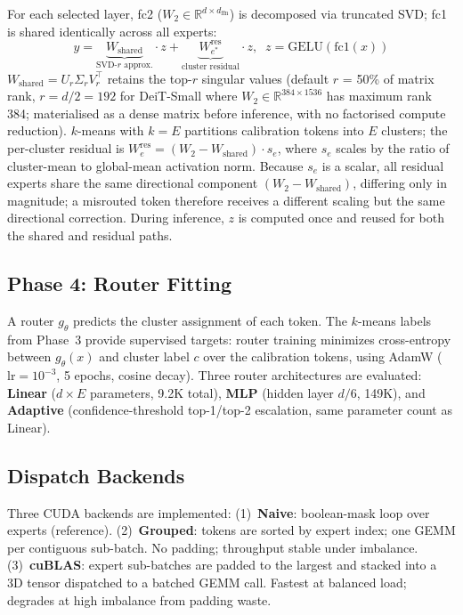 \documentclass[conference]{IEEEtran}
\begin{document}
For each selected layer, fc2 ($W_2 \in \mathbb{R}^{d \times d_\text{ffn}}$) is decomposed via truncated SVD; fc1 is shared identically across all experts:
\begin{equation}
y = \underbrace{W_\text{shared}}_{\text{SVD-}r\text{ approx.}} \!\cdot z + \underbrace{W_{e^*}^\text{res}}_{\text{cluster residual}} \!\cdot z, \;\; z = \text{GELU}(\text{fc1}(x))
\label{eq:decomp}
\end{equation}
$W_\text{shared} = U_r\Sigma_r V_r^\top$ retains the top-$r$ singular values (default $r$ = 50\% of matrix rank, $r{=}d/2{=}192$ for DeiT-Small where $W_2{\in}\mathbb{R}^{384\times1536}$ has maximum rank 384; materialised as a dense matrix before inference, with no factorised compute reduction). $k$-means with $k{=}E$ partitions calibration tokens into $E$ clusters; the per-cluster residual is $W_e^\text{res} = (W_2 - W_\text{shared})\cdot s_e$, where $s_e$ scales by the ratio of cluster-mean to global-mean activation norm. Because $s_e$ is a scalar, all residual experts share the same directional component $(W_2 - W_\text{shared})$, differing only in magnitude; a misrouted token therefore receives a different scaling but the same directional correction. During inference, $z$ is computed once and reused for both the shared and residual paths.

\subsection{Phase 4: Router Fitting}

A router $g_\theta$ predicts the cluster assignment of each token. The $k$-means labels from Phase~3 provide supervised targets: router training minimizes cross-entropy between $g_\theta(x)$ and cluster label $c$ over the calibration tokens, using AdamW ($\text{lr}{=}10^{-3}$, 5 epochs, cosine decay). Three router architectures are evaluated: \textbf{Linear} ($d\times E$ parameters, 9.2K total), \textbf{MLP} (hidden layer $d/6$, 149K), and \textbf{Adaptive} (confidence-threshold top-1/top-2 escalation, same parameter count as Linear).

\subsection{Dispatch Backends}

Three CUDA backends are implemented: (1)~\textbf{Naive}: boolean-mask loop over experts (reference). (2)~\textbf{Grouped}: tokens are sorted by expert index; one GEMM per contiguous sub-batch. No padding; throughput stable under imbalance. (3)~\textbf{cuBLAS}: expert sub-batches are padded to the largest and stacked into a 3D tensor dispatched to a batched GEMM call. Fastest at balanced load; degrades at high imbalance from padding waste.
\end{document}

